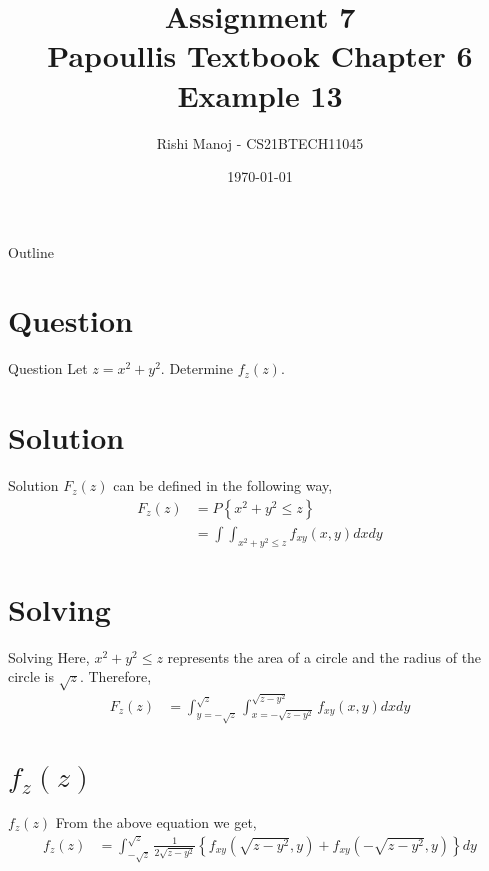 \documentclass{beamer}
\title{Assignment 7 \\ Papoullis Textbook Chapter 6 Example 13}
\author{Rishi Manoj - CS21BTECH11045}
\date{\today}
\providecommand{\cbrak}[1]{\ensuremath{\left\{#1\right\}}}
\begin{document}
\begin{frame}
    \titlepage 
\end{frame}

\logo{}


\begin{frame}{Outline}
    \tableofcontents
\end{frame}


\section{Question}
\begin{frame}{Question}
Let $z = x^2 + y^2$. Determine $f_z(z)$.
\end{frame}


\section{Solution}
\begin{frame}{Solution}
$F_z(z)$ can be defined in the following way,
	\begin{align}
	       F_z(z) &= P\cbrak{x^2+y^2 \le z} \\
	              &= \int \int_{x^2+y^2 \le z}f_{xy}(x,y)dx dy
	\end{align}
\end{frame}


\section{Solving}
\begin{frame}{Solving}
Here, $x^2+y^2 \le z$ represents the area of a circle and the radius of the circle is $\sqrt{z}$. Therefore, 
	\begin{align}
	      F_z(z) &= \int_{y=-\sqrt{z}}^{\sqrt{z}} \int_{x=-\sqrt{z-y^2}}^{\sqrt{z-y^2}}f_{xy}(x,y)dx dy 
    \end{align}
\end{frame}


\section{$f_z(z)$}
\begin{frame}{$f_z(z)$}
From the above equation we get,
    \begin{align}
          f_z(z) &= \int_{-\sqrt{z}}^{\sqrt{z}}\frac{1}{2\sqrt{z-y^2}}\cbrak{f_{xy}(\sqrt{z-y^2},y)+f_{xy}(-\sqrt{z-y^2},y)}dy
    \end{align}
\end{frame}
\end{document}
